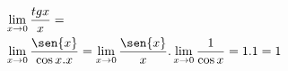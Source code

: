 \begin{ex}
\begin{align}
&\lim_{x\rightarrow 0} \frac{tg{x}}{x}=\nonumber\\
&\lim_{x\rightarrow 0} \frac{\sen{x}}{\cos{x}.x}=\lim_{x\rightarrow 0} \frac{\sen{x}}{x}.\lim_{x\rightarrow 0} \frac{1}{\cos{x}}=1.1=1\nonumber
\end{align}
\end{ex}